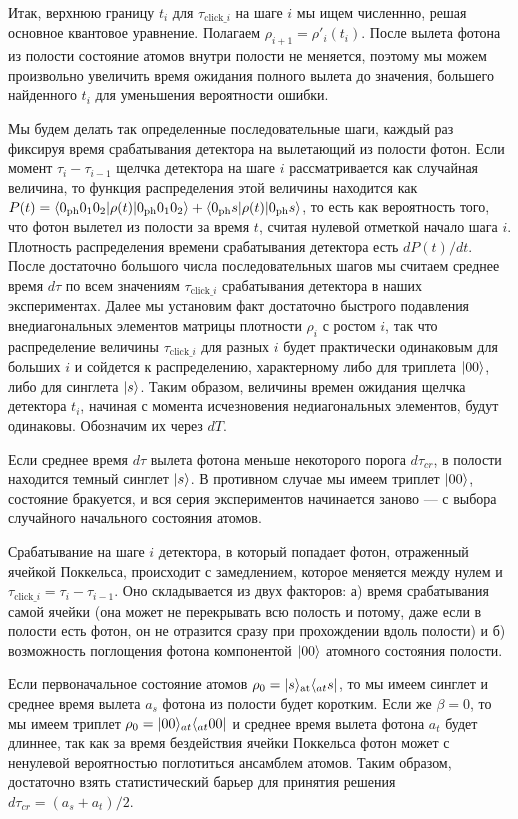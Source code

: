 Итак, верхнюю границу $t_i$ для $\tau_{\text{click}\_i}$ на шаге $i$ мы ищем численнно, решая основное квантовое уравнение. Полагаем $\rho_{i+1}=\rho'_i(t_{i})$. После вылета фотона из полости состояние атомов внутри полости не меняется, поэтому мы можем произвольно увеличить время ожидания полного вылета до значения, большего найденного $t_i$ для уменьшения вероятности ошибки.

Мы будем делать так определенные последовательные шаги, каждый раз фиксируя время срабатывания детектора на вылетающий из полости фотон. Если момент $\tau_i-\tau_{i-1}$ щелчка детектора на шаге $i$ рассматривается как случайная величина, то функция распределения этой величины находится как $P(t)=\langle 0_{\text{ph}}0_10_2|\rho(t)|0_{\text{ph}}0_10_2\rangle+\langle 0_{\text{ph}}s|\rho(t)|0_{\text{ph}}s\rangle$, то есть как вероятность того, что фотон вылетел из полости за время $t$, считая нулевой отметкой начало шага $i$. Плотность распределения времени срабатывания детектора есть $dP(t)/dt$. После достаточно большого числа последовательных шагов мы считаем среднее время $d\tau$ по всем значениям $\tau_{\text{click}\_i}$ срабатывания детектора в наших экспериментах. Далее мы установим факт достаточно быстрого подавления внедиагональных элементов матрицы плотности $\rho_i$ с ростом $i$, так что распределение величины $\tau_{\text{click}\_i}$ для разных $i$ будет практически одинаковым для больших $i$ и сойдется к распределению, характерному  либо для триплета $|00\rangle$,  либо для синглета $|s\rangle$. Таким образом, величины времен ожидания щелчка детектора $t_i$, начиная с момента исчезновения недиагональных элементов, будут одинаковы. Обозначим их через $dT$. 

Если среднее время $d\tau$ вылета фотона меньше некоторого порога $d\tau_{cr}$, в полости находится темный синглет $|s\rangle$. В противном случае мы имеем триплет $|00\rangle$, состояние бракуется, и вся серия экспериментов начинается заново --- с выбора случайного начального состояния атомов.

Срабатывание на шаге $i$ детектора, в который попадает фотон, отраженный ячейкой Поккельса, происходит с замедлением, которое меняется между нулем и $\tau_{\text{click}\_i}=\tau_{i}-\tau_{i-1}$. Оно складывается из двух факторов: а) время срабатывания самой ячейки (она может не перекрывать всю полость и потому, даже если в полости есть фотон, он не отразится сразу при прохождении вдоль полости) и б) возможность поглощения фотона компонентой $|00\rangle$ атомного состояния  полости.  

Если первоначальное состояние атомов $\rho_0=|s\rangle_{\text{at}}\langle_{at} s|$, то мы имеем синглет и среднее время вылета $a_s$ фотона из полости будет коротким. Если же $\beta=0$, то мы имеем триплет $\rho_0=|00\rangle_{at}\langle_{at} 00|$ и среднее время вылета фотона $a_t$ будет длиннее, так как за время бездействия ячейки Поккельса фотон может с ненулевой вероятностью поглотиться ансамблем атомов. Таким образом, достаточно взять статистический барьер для принятия решения $d\tau_{cr}=(a_s+a_t)/2$. 

